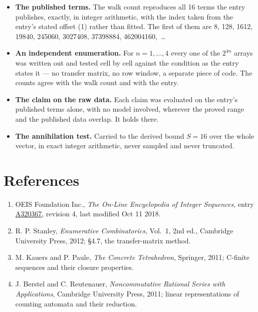 \documentclass[11pt]{article}
\theoremstyle{definition}
\begin{document}
\begin{itemize}

\item {\bfseries The published terms.} The walk count reproduces all 16 terms the entry publishes, exactly, in integer arithmetic, with the index taken from the entry's stated offset (1) rather than fitted. The first of them are 8, 128, 1612, 19840, 245060, 3027408, 37398884, 462004160,~\dots

\item {\bfseries An independent enumeration.} For $n = 1,\dots,4$ every one of the $2^{4n}$ arrays was written out and tested cell by cell against the condition as the entry states it --- no transfer matrix, no row window, a separate piece of code. The counts agree with the walk count and with the entry.

\item {\bfseries The claim on the raw data.} Each claim was evaluated on the entry's published terms alone, with no model involved, wherever the proved range and the published data overlap. It holds there.

\item {\bfseries The annihilation test.} Carried to the derived bound $S = 16$ over the whole vector, in exact integer arithmetic, never sampled and never truncated.

\end{itemize}

\section{References}

\begin{enumerate}

\item OEIS Foundation Inc., \emph{The On-Line Encyclopedia of Integer Sequences}, entry \href{https://oeis.org/A320367}{A320367}, revision 4, last modified Oct 11 2018.

\item R. P. Stanley, \emph{Enumerative Combinatorics}, Vol.~1, 2nd ed., Cambridge University Press, 2012; \S4.7, the transfer-matrix method.

\item M. Kauers and P. Paule, \emph{The Concrete Tetrahedron}, Springer, 2011; C-finite sequences and their closure properties.

\item J. Berstel and C. Reutenauer, \emph{Noncommutative Rational Series with Applications}, Cambridge University Press, 2011; linear representations of counting automata and their reduction.

\end{enumerate}
\end{document}
